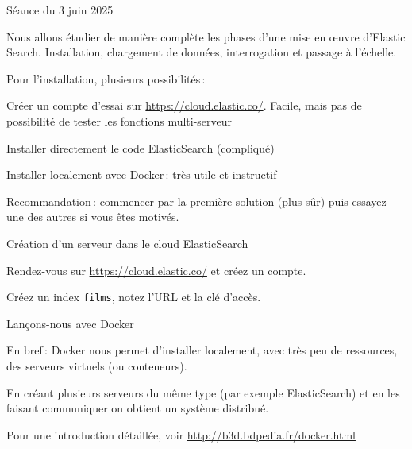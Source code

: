 
\begin{frame}[fragile]{Séance du 3 juin 2025}

Nous allons étudier de manière complète les phases
d'une mise en œuvre d'Elastic Search. Installation, chargement de données,
interrogation et passage à l'échelle.

\vfill

Pour l'installation, plusieurs possibilités\,:

\vfill 

\begin{redbullet}
  \item Créer un compte d'essai sur \url{https://cloud.elastic.co/}. Facile, mais 
     pas de possibilité de tester les fonctions multi-serveur
  \item Installer directement le code ElasticSearch (compliqué)
  \item Installer localement avec Docker\,: très utile et instructif
\end{redbullet}

\vfill

Recommandation\,: commencer par la première solution (plus sûr) puis
essayez une des autres si vous êtes motivés.

\end{frame}


\begin{frame}[fragile]{Création d'un serveur dans le cloud ElasticSearch}

Rendez-vous sur \url{https://cloud.elastic.co/} et créez un compte.

\vfill

Créez un index \texttt{films}, notez l'URL et la clé d'accès.

\vfill


\end{frame}


\begin{frame}[fragile]{Lançons-nous avec Docker}

En bref\,: Docker nous permet d'installer localement, avec
très peu de ressources, des serveurs virtuels (ou \alert{conteneurs}).


\vfill 
En créant plusieurs serveurs du même type (par exemple ElasticSearch) et
en les faisant communiquer on obtient un \alert{système distribué}.

\vfill 
Pour une introduction détaillée, voir \url{http://b3d.bdpedia.fr/docker.html}

\end{frame}




